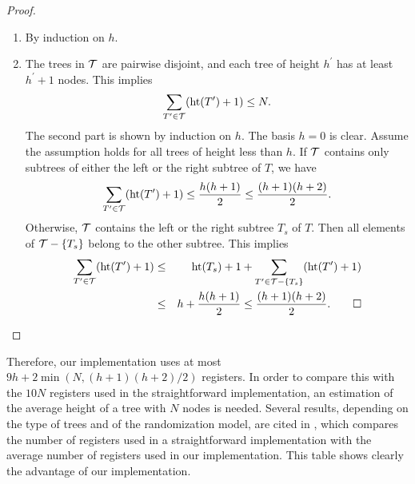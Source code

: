 \begin{proof}                                                                   
\begin{enumerate}                                                               
\item By induction on $h$.\label{stackdepth}                                           
\item The trees in ${\cal T}$ are pairwise disjoint, and each tree of                 
      height $h^\prime$ has at least $h^\prime+1$ nodes. This implies           
      $$\sum_{T^\prime\in {\cal T}}({\rm ht}(T^\prime)+1)                             
        \le N.$$                                                                
      The second part is shown by induction on $h$.                           
      The basis $h=0$ is clear.                                                 
      Assume the assumption holds for all trees of height less than             
      $h$. If ${\cal T}$                                                              
      contains only subtrees of either the left or the right subtree            
      of $T$, we have                                                           
      $$\sum_{T^\prime\in {\cal T}}({\rm ht}(T^\prime)+1)\le                          
      {h(h+1)\over2}\le{(h+1)(h+2)\over2}.$$                                    
      Otherwise, ${\cal T}$ contains the left or the right subtree $T_s$ of           
      $T$. Then all elements of ${\cal T}-\{T_s\}$ belong to the other                
      subtree. This implies                                                     
      \begin{eqnarray*}                                                         
      \sum_{T^\prime\in \T}({\rm ht}(T^\prime)+1)&\le&                          
      {\rm ht}(T_s)+1                                                           
      +\sum_{T^\prime\in \T-\{T_s\}}({\rm ht}(T^\prime)+1)\\                    
      &\le& h+{h(h+1)\over2}\le{(h+1)(h+2)\over2}.\proofend                       
      \end{eqnarray*}                                                           
\end{enumerate}                                                                 
\end{proof}                                                                     
                                                                                
Therefore, our implementation uses at most $9h+2\min(N,(h+1)(h+2)/2)$          
registers. In order to compare this with the                                    
$10N$ registers used in the straightforward implementation,                     
an estimation of the average height of a tree with $N$ nodes is                 
needed. Several results, depending on the type of trees and of the                       
randomization model, are cited in , which 
compares the number of registers used in a straightforward           
implementation with the average number of registers used in our                 
implementation. This table shows clearly the advantage of our                  
implementation. 

